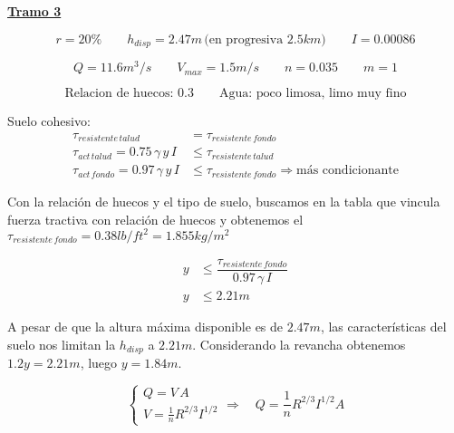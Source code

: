 \underline{\bf Tramo 3}


\begin{equation*}
  r = 20\%
 \qquad
  h_{disp} = 2.47 m \,\text{(en progresiva }2.5 km \text{)}
 \qquad
  I = 0.00086
\end{equation*}

\begin{equation*}
  Q = 11.6 m^3/s
 \qquad
  V_{max} = 1.5 m/s
 \qquad
  n = 0.035
 \qquad
  m = 1
\end{equation*}

\begin{equation*}
  \text{Relacion de huecos: 0.3}
  \qquad
  \text{Agua: poco limosa, limo muy fino}
\end{equation*}

Suelo cohesivo:
\begin{align*}
 \tau_{resistente\,talud} &= \tau_{resistente\,fondo} \\
 \tau_{act\,talud} = 0.75 \, \gamma \, y \, I &\leq \tau_{resistente\,talud} \\
 \tau_{act\,fondo} = 0.97 \, \gamma \, y \, I &\leq \tau_{resistente\,fondo} \Longrightarrow \text{más condicionante}
\end{align*}

Con la relación de huecos y el tipo de suelo, buscamos en la tabla que vincula fuerza tractiva con relación de huecos y obtenemos
el $\tau_{resistente\,fondo} = 0.38 lb/ft^2 = 1.855 kg/m^2$

\begin{align*}
 y &\leq \dfrac{\tau_{resistente\,fondo}}{0.97 \, \gamma \, I} \\
 y &\leq 2.21 m
\end{align*}

A pesar de que la altura máxima disponible es de $2.47 m$, las características del suelo nos limitan la $h_{disp}$ a $2.21 m$.
Considerando la revancha obtenemos $1.2 y = 2.21 m$, luego $y = 1.84 m$.

\begin{equation*}
  \begin{cases}
    Q = V \, A \\
    V =  \frac{1}{n} R^{2/3} I^{1/2}
  \end{cases}
  \Longrightarrow \quad
  Q = \frac{1}{n} R^{2/3} I^{1/2} A
\end{equation*}

